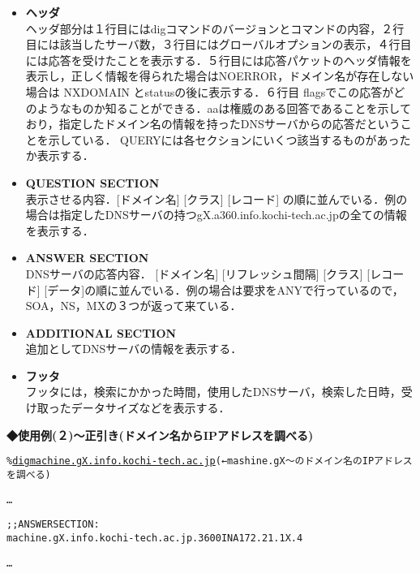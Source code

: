 \begin{itemize}
\item {\bf ヘッダ}\\
 ヘッダ部分は１行目にはdigコマンドのバージョンとコマンドの内容，２行目には該当したサーバ数，３行目にはグローバルオプションの表示，４行目には応答を受けたことを表示する．５行目には応答パケットのヘッダ情報を表示し，正しく情報を得られた場合はNOERROR，ドメイン名が存在しない場合は NXDOMAIN とstatusの後に表示する．６行目 flagsでこの応答がどのようなものか知ることができる．aaは権威のある回答であることを示しており，指定したドメイン名の情報を持ったDNSサーバからの応答だということを示している． QUERYには各セクションにいくつ該当するものがあったか表示する．  

\item {\bf QUESTION SECTION}\\
 表示させる内容．[ドメイン名] [クラス] [レコード] の順に並んでいる．例の場合は指定したDNSサーバの持つgX.a360.info.kochi-tech.ac.jpの全ての情報を表示する．

\item {\bf ANSWER SECTION}\\
 DNSサーバの応答内容． [ドメイン名] [リフレッシュ間隔] [クラス] [レコード] [データ]の順に並んでいる．例の場合は要求をANYで行っているので，SOA，NS，MXの３つが返って来ている．

\item {\bf ADDITIONAL SECTION}\\
 追加としてDNSサーバの情報を表示する．

\item {\bf フッタ}\\
 フッタには，検索にかかった時間，使用したDNSサーバ，検索した日時，受け取ったデータサイズなどを表示する．
\end{itemize}
\noindent
{\bf ◆使用例(２)〜正引き(ドメイン名からIPアドレスを調べる)}
\begin{center}
\begin{breakbox}
\begin{alltt}
\% \underline{dig machine.gX.info.kochi-tech.ac.jp} (←mashine.gX〜のドメイン名のIPアドレスを調べる)

…

;; ANSWER SECTION:
machine.gX.info.kochi-tech.ac.jp. 3600 IN A  172.21.1X.4

…

\end{alltt}
\end{breakbox}
\end{center}

